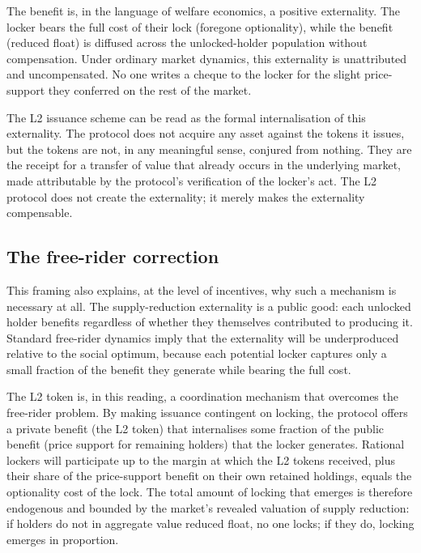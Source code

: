 \documentclass[11pt,a4paper]{article}
\begin{document}
The benefit is, in the language of welfare economics, a positive externality. The locker bears the full cost of their lock (foregone optionality), while the benefit (reduced float) is diffused across the unlocked-holder population without compensation. Under ordinary market dynamics, this externality is unattributed and uncompensated. No one writes a cheque to the locker for the slight price-support they conferred on the rest of the market.

The L2 issuance scheme can be read as the formal internalisation of this externality. The protocol does not acquire any asset against the tokens it issues, but the tokens are not, in any meaningful sense, conjured from nothing. They are the receipt for a transfer of value that already occurs in the underlying market, made attributable by the protocol's verification of the locker's act. The L2 protocol does not create the externality; it merely makes the externality compensable.

\subsection{The free-rider correction}

This framing also explains, at the level of incentives, why such a mechanism is necessary at all. The supply-reduction externality is a public good: each unlocked holder benefits regardless of whether they themselves contributed to producing it. Standard free-rider dynamics imply that the externality will be underproduced relative to the social optimum, because each potential locker captures only a small fraction of the benefit they generate while bearing the full cost.

The L2 token is, in this reading, a coordination mechanism that overcomes the free-rider problem. By making issuance contingent on locking, the protocol offers a private benefit (the L2 token) that internalises some fraction of the public benefit (price support for remaining holders) that the locker generates. Rational lockers will participate up to the margin at which the L2 tokens received, plus their share of the price-support benefit on their own retained holdings, equals the optionality cost of the lock. The total amount of locking that emerges is therefore endogenous and bounded by the market's revealed valuation of supply reduction: if holders do not in aggregate value reduced float, no one locks; if they do, locking emerges in proportion.
\end{document}
